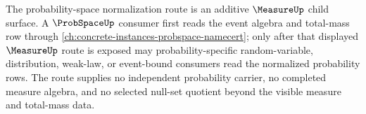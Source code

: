 The probability-space normalization route is an additive $\MeasureUp$ child surface. A $\ProbSpaceUp$ consumer first reads the event algebra and total-mass row through \autoref{ch:concrete-instances-probspace-namecert}; only after that displayed $\MeasureUp$ route is exposed may probability-specific random-variable, distribution, weak-law, or event-bound consumers read the normalized probability rows. The route supplies no independent probability carrier, no completed measure algebra, and no selected null-set quotient beyond the visible measure and total-mass data.
